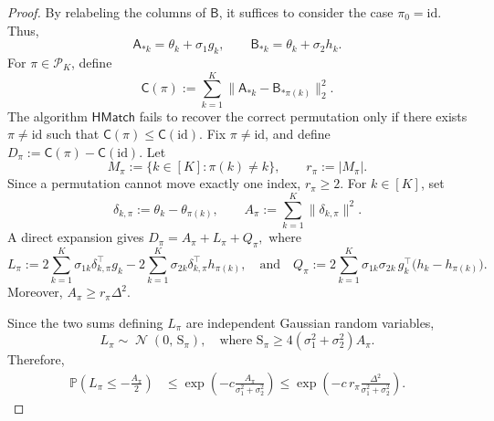 \documentclass[10pt]{article}
\DeclareMathOperator{\dnorm}{\mathcal N}
\newcommand{\matchmodule}{\mathsf{HMatch}}
\begin{document}
\begin{proof} 
By relabeling the columns of $\mathsf B$, it suffices to consider the case $\pi_0=\mathrm{id}$. Thus, 
\[ 
\mathsf A_{*k} = \theta_k+\sigma_1g_k, \qquad \mathsf B_{*k} = \theta_k+\sigma_2h_k. 
\]
For $\pi\in\mathcal P_K$, define 
\[ 
\mathsf C(\pi) := \sum_{k=1}^K \|\mathsf A_{*k}-\mathsf B_{*\pi(k)}\|^2_2. 
\] 
The algorithm $\matchmodule{}$ fails to recover the correct permutation only if there exists $\pi\neq\mathrm{id}$ such that 
\( 
\mathsf C(\pi)\le \mathsf C(\mathrm{id}). 
\)
Fix $\pi\neq\mathrm{id}$, and define $D_\pi := \mathsf C(\pi)-\mathsf C(\mathrm{id}).$ Let 
\[ 
M_\pi := \{k\in[K]:\pi(k)\neq k\}, \qquad r_\pi:=|M_\pi|. 
\] 
Since a permutation cannot move exactly one index, $r_\pi\ge2$. For $k\in[K]$, set 
\[ 
\delta_{k,\pi} := \theta_k-\theta_{\pi(k)}, \qquad A_\pi := \sum_{k=1}^K \|\delta_{k,\pi}\|^2. 
\] 
A direct expansion gives $D_\pi=A_\pi+L_\pi+Q_\pi,$
where 
\[ 
L_\pi := 2 \sum_{k=1}^K \sigma_{1k}\delta_{k,\pi}^{\top}g_k - 2 \sum_{k=1}^K \sigma_{2k}\delta_{k,\pi}^{\top}h_{\pi(k)}, \quad \mbox{and} \quad Q_\pi := 2\sum_{k=1}^K \sigma_{1k}\sigma_{2k}\,g_k^\top \bigl(h_k-h_{\pi(k)}\bigr).
\] 
Moreover, $A_\pi \ge r_\pi\Delta^2.$ 

Since the two sums defining $L_\pi$ are independent Gaussian random variables, 
\[
L_\pi \sim \dnorm\left( 0,\, \mathrm S_\pi \right), \quad \mbox{where $\mathrm S_\pi \ge 4(\sigma^2_1+\sigma^2_2)A_\pi$.} 
\]
Therefore, 
\begin{align} 
\mathbb P\left( L_\pi\le-\frac{A_\pi}{2} \right) &\le \exp\left( -c\frac{A_\pi}{\sigma_1^2+\sigma_2^2} \right) \le \exp\left( -c\,r_\pi \frac{\Delta^2}{\sigma_1^2+\sigma_2^2} \right). 
\end{align}


\end{proof}
\end{document}
